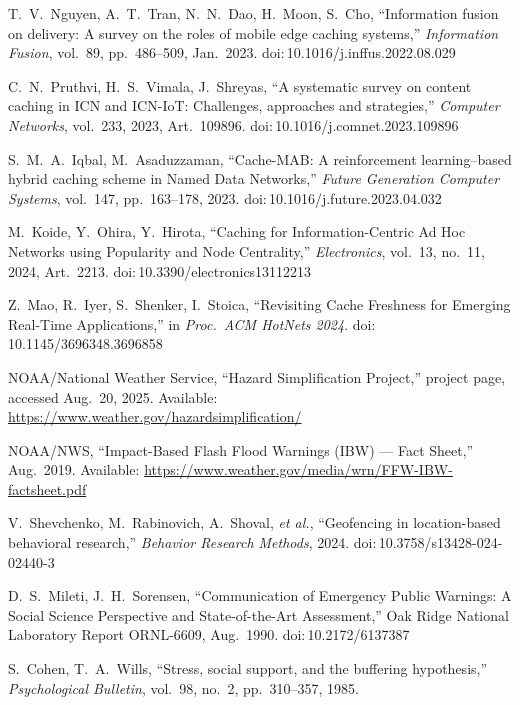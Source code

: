\documentclass[11pt,twocolumn]{article}
\begin{document}
\begin{thebibliography}{99}
T.\ V.\ Nguyen, A.\ T.\ Tran, N.\ N.\ Dao, H.\ Moon, S.\ Cho, ``Information fusion on delivery: A survey on the roles of mobile edge caching systems,'' \emph{Information Fusion}, vol.\ 89, pp.\ 486--509, Jan.\ 2023. doi:\,10.1016/j.inffus.2022.08.029

C.\ N.\ Pruthvi, H.\ S.\ Vimala, J.\ Shreyas, ``A systematic survey on content caching in ICN and ICN-IoT: Challenges, approaches and strategies,'' \emph{Computer Networks}, vol.\ 233, 2023, Art.\ 109896. doi:\,10.1016/j.comnet.2023.109896

S.\ M.\ A.\ Iqbal, M.\ Asaduzzaman, ``Cache-MAB: A reinforcement learning–based hybrid caching scheme in Named Data Networks,'' \emph{Future Generation Computer Systems}, vol.\ 147, pp.\ 163--178, 2023. doi:\,10.1016/j.future.2023.04.032

M.\ Koide, Y.\ Ohira, Y.\ Hirota, ``Caching for Information-Centric Ad Hoc Networks using Popularity and Node Centrality,'' \emph{Electronics}, vol.\ 13, no.\ 11, 2024, Art.\ 2213. doi:\,10.3390/electronics13112213

Z.\ Mao, R.\ Iyer, S.\ Shenker, I.\ Stoica, ``Revisiting Cache Freshness for Emerging Real-Time Applications,'' in \emph{Proc.\ ACM HotNets 2024}. doi:\,10.1145/3696348.3696858

NOAA/National Weather Service, ``Hazard Simplification Project,'' project page, accessed Aug.\ 20, 2025. Available: \url{https://www.weather.gov/hazardsimplification/}

NOAA/NWS, ``Impact-Based Flash Flood Warnings (IBW) — Fact Sheet,'' Aug.\ 2019. Available: \url{https://www.weather.gov/media/wrn/FFW-IBW-factsheet.pdf}

V.\ Shevchenko, M.\ Rabinovich, A.\ Shoval, \emph{et al.}, ``Geofencing in location-based behavioral research,'' \emph{Behavior Research Methods}, 2024. doi:\,10.3758/s13428-024-02440-3

D.\ S.\ Mileti, J.\ H.\ Sorensen, ``Communication of Emergency Public Warnings: A Social Science Perspective and State-of-the-Art Assessment,'' Oak Ridge National Laboratory Report ORNL-6609, Aug.\ 1990. doi:\,10.2172/6137387

S.\ Cohen, T.\ A.\ Wills, ``Stress, social support, and the buffering hypothesis,'' \emph{Psychological Bulletin}, vol.\ 98, no.\ 2, pp.\ 310--357, 1985.


\end{thebibliography}
\end{document}
